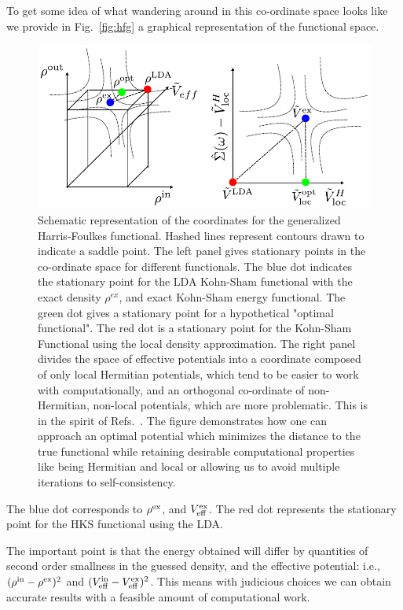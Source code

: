 To get some idea of what wandering around in this co-ordinate space
looks like we provide in Fig.~\ref{fig:hfg} a 
graphical representation of the functional space.
%
\begin{figure}
\begin{center}
\includegraphics{./GW/HFG_space.pdf}
\caption{Schematic representation of the coordinates for the generalized
Harris-Foulkes functional. Hashed lines represent contours drawn to indicate
a saddle point. The left panel gives stationary points in the co-ordinate space
for different functionals. The blue dot indicates the stationary point for the
LDA Kohn-Sham functional with the exact density $\rho^{ex}$, 
and exact Kohn-Sham energy functional. The green dot gives a stationary point
for a hypothetical "optimal functional". The red dot is a stationary point
for the Kohn-Sham Functional using the local density approximation. 
The right panel divides the space of effective potentials into a coordinate 
composed of only local Hermitian potentials, which tend 
to be easier to work with computationally, and an orthogonal co-ordinate 
of non-Hermitian, non-local potentials, which are more problematic. 
This is in the spirit of Refs.~\cite{sohrab10, patrick12}. 
The figure demonstrates how one can approach an optimal
potential which minimizes the distance to the true functional 
while retaining desirable computational properties like being Hermitian and local
or allowing us to avoid multiple iterations to self-consistency.}
\end{center}
\end{figure}
%
The blue dot corresponds to $\rho^{\rm ex}$, and $V^{\rm ex}_{\rm eff}$. The red dot
represents the stationary point for the HKS functional using the LDA.

The important point is that the energy obtained will differ by quantities of second
order smallness in the guessed density, and the effective potential: i.e., 
$(\rho^{\rm in}-\rho^{\rm ex})^{2}$ and $(V_{\rm eff}^{\rm in}-V_{\rm eff}^{\rm ex})^{2}$.
This means with judicious choices we can obtain accurate results with a feasible
amount of computational work.

